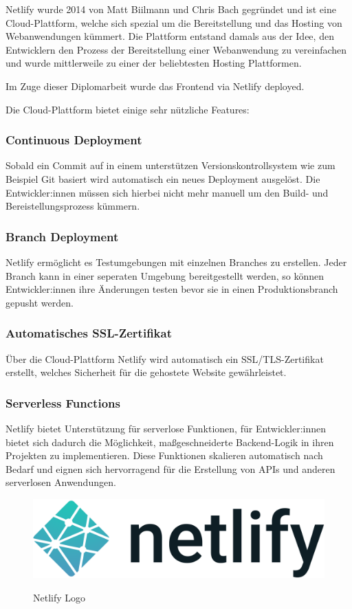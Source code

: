 
Netlify wurde 2014 von Matt Biilmann und Chris Bach gegründet und ist eine Cloud-Plattform, welche sich spezial um die Bereitstellung und das Hosting von Webanwendungen kümmert. Die Plattform entstand damals aus der Idee, den Entwicklern den Prozess der Bereitstellung einer Webanwendung zu vereinfachen und wurde mittlerweile zu einer der beliebtesten Hosting Plattformen.
\cite{Netlify}

Im Zuge dieser Diplomarbeit wurde das Frontend via Netlify deployed.

Die Cloud-Plattform bietet einige sehr nützliche Features:

\subsubsection{Continuous Deployment}
Sobald ein Commit auf in einem unterstützen Versionskontrollsystem wie zum Beispiel Git basiert wird automatisch ein neues Deployment ausgelöst. Die Entwickler:innen müssen sich hierbei nicht mehr manuell um den Build- und Bereistellungsprozess kümmern.

\subsubsection{Branch Deployment}
Netlify ermöglicht es Testumgebungen mit einzelnen Branches zu erstellen. Jeder Branch kann in einer seperaten Umgebung bereitgestellt werden, so können Entwickler:innen ihre Änderungen testen bevor sie in einen Produktionsbranch gepusht werden.

\subsubsection{Automatisches SSL-Zertifikat}
Über die Cloud-Plattform Netlify wird automatisch ein SSL/TLS-Zertifikat erstellt, welches Sicherheit für die gehostete Website gewährleistet.

\subsubsection{Serverless Functions}
Netlify bietet Unterstützung für serverlose Funktionen, für Entwickler:innen bietet sich dadurch die Möglichkeit, maßgeschneiderte Backend-Logik in ihren Projekten zu implementieren. Diese Funktionen skalieren automatisch nach Bedarf und eignen sich hervorragend für die Erstellung von APIs und anderen serverlosen Anwendungen.

\begin{figure}[h!]
    \centering
    \includegraphics[width=0.5\linewidth]{pics/netlify-logo.png}
    \caption{Netlify Logo}
    \label{fig:enter-label}
    \cite{netlify_logo}
\end{figure}

\cite{Was_ist_Netlify}
